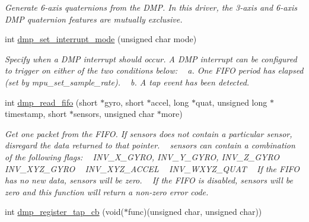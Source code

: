 \begin{DoxyCompactItemize}
\begin{DoxyCompactList}\small\item\em Generate 6-\/axis quaternions from the D\+MP. In this driver, the 3-\/axis and 6-\/axis D\+MP quaternion features are mutually exclusive. \end{DoxyCompactList}\item 
int \hyperlink{group___d_r_i_v_e_r_s_gaf10c08103d2aec9aa5555a5694bafced}{dmp\+\_\+set\+\_\+interrupt\+\_\+mode} (unsigned char mode)
\begin{DoxyCompactList}\small\item\em Specify when a D\+MP interrupt should occur. A D\+MP interrupt can be configured to trigger on either of the two conditions below\+: ~\newline
 a. One F\+I\+FO period has elapsed (set by {\itshape mpu\+\_\+set\+\_\+sample\+\_\+rate}). ~\newline
 b. A tap event has been detected. \end{DoxyCompactList}\item 
int \hyperlink{group___d_r_i_v_e_r_s_ga02db5f25359abe84be002c543cdc3803}{dmp\+\_\+read\+\_\+fifo} (short $\ast$gyro, short $\ast$accel, long $\ast$quat, unsigned long $\ast$timestamp, short $\ast$sensors, unsigned char $\ast$more)
\begin{DoxyCompactList}\small\item\em Get one packet from the F\+I\+FO. If {\itshape sensors} does not contain a particular sensor, disregard the data returned to that pointer. ~\newline
 {\itshape sensors} can contain a combination of the following flags\+: ~\newline
 I\+N\+V\+\_\+\+X\+\_\+\+G\+Y\+RO, I\+N\+V\+\_\+\+Y\+\_\+\+G\+Y\+RO, I\+N\+V\+\_\+\+Z\+\_\+\+G\+Y\+RO ~\newline
 I\+N\+V\+\_\+\+X\+Y\+Z\+\_\+\+G\+Y\+RO ~\newline
 I\+N\+V\+\_\+\+X\+Y\+Z\+\_\+\+A\+C\+C\+EL ~\newline
 I\+N\+V\+\_\+\+W\+X\+Y\+Z\+\_\+\+Q\+U\+AT ~\newline
 If the F\+I\+FO has no new data, {\itshape sensors} will be zero. ~\newline
 If the F\+I\+FO is disabled, {\itshape sensors} will be zero and this function will return a non-\/zero error code. \end{DoxyCompactList}\item 
int \hyperlink{group___d_r_i_v_e_r_s_ga8a2df36126e34b78863e3acf1249d814}{dmp\+\_\+register\+\_\+tap\+\_\+cb} (void($\ast$func)(unsigned char, unsigned char))

\end{DoxyCompactItemize}
